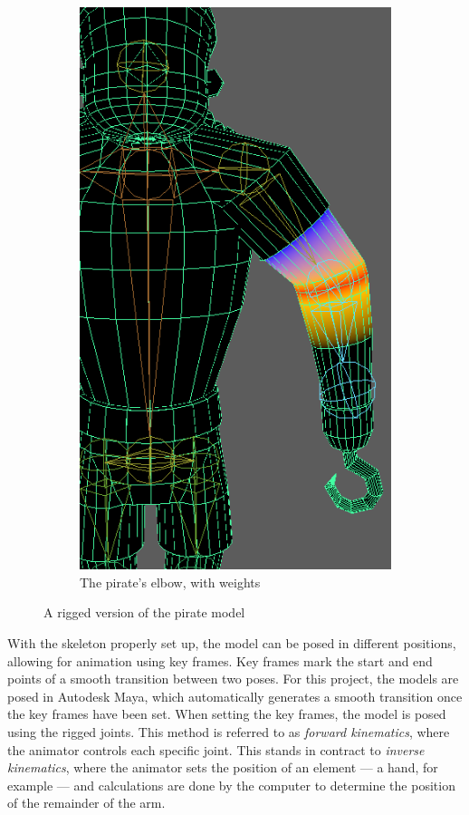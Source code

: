 \begin{figure}[h!]
\begin{subfigure}[b]{0.45\textwidth}
		\includegraphics[scale=0.6]{figures/elbow_pirate.png}
		\caption{The pirate's elbow, with weights}
		\label{fig:elbow_pirate}
	\end{subfigure}
	\caption{A rigged version of the pirate model}
	\label{fig:riggin}
\end{figure}

With the skeleton properly set up, the model can be posed in different positions, allowing for animation using key frames. Key frames mark the start and end points of a smooth transition between two poses. For this project, the models are posed in Autodesk Maya, which automatically generates a smooth transition once the key frames have been set. When setting the key frames, the model is posed using the rigged joints. This method is referred to as \textit{forward kinematics}, where the animator controls each specific joint. This stands in contract to \textit{inverse kinematics}, where the animator sets the position of an element --- a hand, for example --- and calculations are done by the computer to determine the position of the remainder of the arm.

